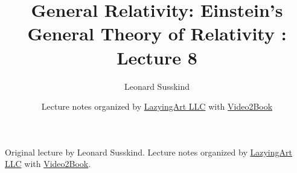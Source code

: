 \documentclass[11pt,oneside]{book}
\begin{document}
\frontmatter
\title{General Relativity: Einstein's General Theory of Relativity : Lecture 8}
\author{Leonard Susskind}
\date{Lecture notes organized by \href{https://lazying.art}{LazyingArt LLC} with \href{https://github.com/lachlanchen/Video2Book}{Video2Book}}
\maketitle
\begin{center}
\small Original lecture by Leonard Susskind. Lecture notes organized by \href{https://lazying.art}{LazyingArt LLC} with \href{https://github.com/lachlanchen/Video2Book}{Video2Book}.
\end{center}
\clearpage
\mainmatter

\end{document}
